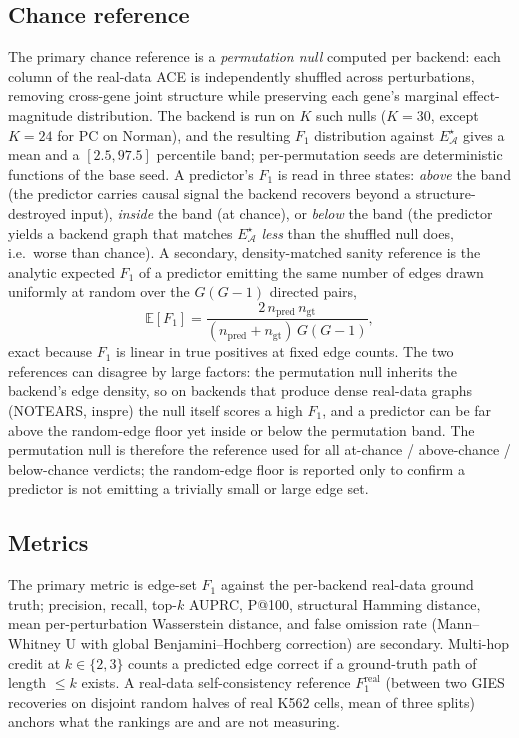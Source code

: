 \documentclass{article}
\theoremstyle{plain}
\theoremstyle{definition}
\theoremstyle{remark}
\begin{document}
\subsection{Chance reference}
\label{app:chance}
The primary chance reference is a \emph{permutation null} computed per backend: each column of the real-data ACE is independently shuffled across perturbations, removing cross-gene joint structure while preserving each gene's marginal effect-magnitude distribution. The backend is run on $K$ such nulls ($K=30$, except $K=24$ for PC on Norman), and the resulting $F_1$ distribution against $E^{\star}_{\mathcal{A}}$ gives a mean and a $[2.5,97.5]$ percentile band; per-permutation seeds are deterministic functions of the base seed. A predictor's $F_1$ is read in three states: \emph{above} the band (the predictor carries causal signal the backend recovers beyond a structure-destroyed input), \emph{inside} the band (at chance), or \emph{below} the band (the predictor yields a backend graph that matches $E^{\star}_{\mathcal{A}}$ \emph{less} than the shuffled null does, i.e.\ worse than chance). A secondary, density-matched sanity reference is the analytic expected $F_1$ of a predictor emitting the same number of edges drawn uniformly at random over the $G(G{-}1)$ directed pairs,
\[
\mathbb{E}[F_1]=\frac{2\,n_{\text{pred}}\,n_{\text{gt}}}{(n_{\text{pred}}+n_{\text{gt}})\,G(G{-}1)},
\]
exact because $F_1$ is linear in true positives at fixed edge counts. The two references can disagree by large factors: the permutation null inherits the backend's edge density, so on backends that produce dense real-data graphs (NOTEARS, inspre) the null itself scores a high $F_1$, and a predictor can be far above the random-edge floor yet inside or below the permutation band. The permutation null is therefore the reference used for all at-chance / above-chance / below-chance verdicts; the random-edge floor is reported only to confirm a predictor is not emitting a trivially small or large edge set.

\subsection{Metrics}
The primary metric is edge-set $F_1$ against the per-backend real-data ground truth; precision, recall, top-$k$ AUPRC, P@100, structural Hamming distance, mean per-perturbation Wasserstein distance, and false omission rate (Mann--Whitney U with global Benjamini--Hochberg correction) are secondary. Multi-hop credit at $k\in\{2,3\}$ counts a predicted edge correct if a ground-truth path of length $\leq k$ exists. A real-data self-consistency reference $F_1^{\text{real}}$ (between two GIES recoveries on disjoint random halves of real K562 cells, mean of three splits) anchors what the rankings are and are not measuring.
\end{document}
